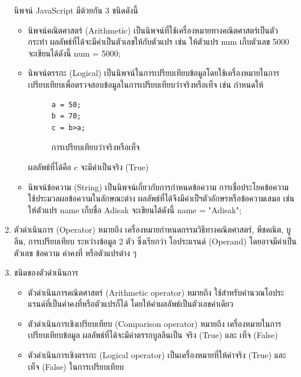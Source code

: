 \begin{enumerate}
		 นิพจน์ JavaScript มีด้วยกัน 3 ชนิดดังนี้
			 \begin{itemize}
			 	 \item นิพจน์คณิตศาสตร์ (Arithmetic) เป็นนิพจน์ที่ใช้เครื่องหมายทางคณิตศาสตร์เป็นตัวกระทำ ผลลัพธ์ที่ได้จะมีค่าเป็นตัวเลขให้กับตัวแปร
			 	 เช่น ให้ตัวแปร num เก็บตัวเลข 5000 จะเขียนได้ดังนี้
			 	 num = 5000;
			 	 \item นิพจน์ตรรกะ (Logical) เป็นนิพจน์ในการเปรียบเทียบข้อมูลโดยใช้เครื่องหมายในการเปรียบเทียบเพื่อตรวจสอบข้อมูลในการเปรียบเทียบว่าจริงหรือเท็จ
			 	 เช่น กำหนดให้ 
			 	 		 			\begin{figure}[H]
			 	 		 				{\begin{lstlisting}
a = 50;
b = 70;
c = b>a;
			 	 		 					\end{lstlisting}}
			 	 		 				\caption{การเปรียบเทียบว่าจริงหรือเท็จ}
			 	 		 				\label{Fig:การเปรียบเทียบว่าจริงหรือเท็จ}
			 	 		 			\end{figure}	
			 	 ผลลัพธ์ที่ได้คือ c จะมีค่าเป็นจริง (True)
			 	 \item นิพจน์ข้อความ (String)
			 	 เป็นนิพจน์เกี่ยวกับการกำหนดข้อความ การเชื่อประโยคข้อความ ใช้ประมวลผลข้อความในลักษณะต่าง ผลลัพธ์ที่ได้จึงมีค่าเป็ฯตัวอักษรหรือข้อความเสมอ
			 	 เช่น ให้ตัวแปร name เก็บชื่อ Adisak จะเขียนได้ดังนี้
			 	 name = "Adisak";
			 \end{itemize}
		
		 \item ตัวดำเนินการ (Operator) หมายถึง เครื่องหมายกำหนดกรรมวิธีทางคณิตศาสตร์, พีชคณิต, บูลีน, การเปรียบเทียบ ระหว่างข้อมูล 2 ตัว ซึ่งเรียกว่า โอประแรนด์ (Operand)  โดยอาจมีค่าเป็นตัวเลข ข้อความ ค่าคงที่ หรือตัวแปรต่าง ๆ
		 
		 \item ชนิดของตัวดำเนินการ
			 \begin{itemize}
			 			 \item ตัวดำเนินการคณิตศาสตร์ (Arithmetic operator) หมายถึง ใช้สำหรับคำนวณโอประแรนด์ที่เป็นค่าคงที่หรือตัวแปรก็ได้ โดยให้ค่าผลลัพธ์เป็นตัวเลขค่าเดียว
			 			 
			 			 \item ตัวดำเนินการเชิงเปรียบเทียบ (Comparison operator) หมายถึง เครื่องหมายในการเปรียบเทียบข้อมูล ผลลัพธ์ที่ได้จะมีค่าตรรกบูลลีนเป็น จริง (True) และ เท็จ (False)
			 			 
			 			 \item ตัวดำเนินการเชิงตรรกะ (Logical operator) เป็นเครื่องหมายที่ให้ค่าจริง (True) และ เท็จ (False) ในการเปรียบเทียบ
			 			 

\end{itemize}
\end{enumerate}
